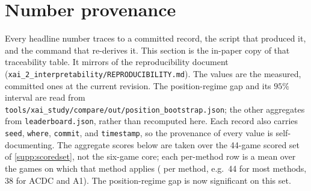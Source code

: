\section{Number provenance}\label{supp:provenance}

Every headline number traces to a committed record, the script that produced it, and the
command that re-derives it. This section is the in-paper copy of that traceability table. It
mirrors  of the reproducibility document
(\texttt{xai\_2\_interpretability/REPRODUCIBILITY.md}). The values are the measured, committed
ones at the current revision. The position-regime gap and its $95\%$ interval are read from
\texttt{tools/xai\_study/compare/out/position\_bootstrap.json}; the other aggregates from
\texttt{leaderboard.json}, rather than recomputed here. Each
record also carries \texttt{seed}, \texttt{where}, \texttt{commit}, and \texttt{timestamp}, so
the provenance of every value is self-documenting. The aggregate scores below are taken over
the 44-game scored set of \Sectionname\ref{supp:scoredset}, not the six-game core;
each per-method row is a mean over the games on which that method applies (
per method, e.g.\ 44 for most methods, 38 for ACDC and A1). The position-regime gap is now
significant on this set.

